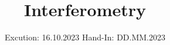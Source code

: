 

\subject{V64}
\title{Interferometry}
\date{%
  Excution: 16.10.2023
  \hspace{3em}
  Hand-In: DD.MM.2023
}



\maketitle
\setcounter{page}{1}







\printbibliography{}


